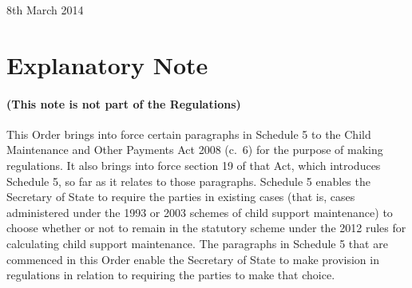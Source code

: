 \documentclass[12pt,a4paper]{article}
\begin{document}
8th March 2014

\small

\part{Explanatory Note}

\renewcommand\parthead{— Explanatory Note}

\subsection*{(This note is not part of the Regulations)}

This Order brings into force certain paragraphs in Schedule 5 to the Child Maintenance and Other Payments Act 2008 (c.~6) for the purpose of making regulations. It also brings into force section 19 of that Act, which introduces Schedule 5, so far as it relates to those paragraphs. Schedule 5 enables the Secretary of State to require the parties in existing cases (that is, cases administered under the 1993 or 2003 schemes of child support maintenance) to choose whether or not to remain in the statutory scheme under the 2012 rules for calculating child support maintenance. The paragraphs in Schedule 5 that are commenced in this Order enable the Secretary of State to make provision in regulations in relation to requiring the parties to make that choice. 
\end{document}
